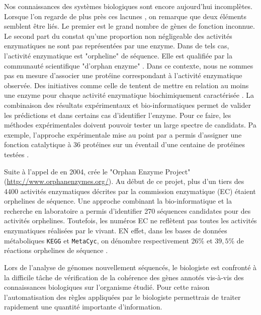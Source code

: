 \begin{refsegment}
    Nos connaissances des systèmes biologiques sont encore aujourd'hui incomplètes. Lorsque l'on regarde de plus près ces lacunes , on remarque que deux éléments semblent être liés. Le premier est le grand nombre de gènes de fonction inconnue. Le second part du constat qu'une proportion non négligeable des activités enzymatiques ne sont pas représentées par une enzyme. Dans de tels cas, l'activité enzymatique est "orpheline" de séquence. Elle est qualifiée par la communauté scientifique "d'orphan enzyme" \cite{lespinet2005orphan}. Dans ce contexte, nous ne sommes pas en mesure d'associer une protéine correspondant à l'activité enzymatique observée. Des initiatives comme celle de \citeauthor{karp2004call} tentent de mettre en relation au moins une enzyme pour chaque activité enzymatique biochimiquement caractérisée \cite{karp2004call}. La combinaison des résultats expérimentaux et bio-informatiques permet de valider les prédictions et dans certains cas d'identifier l'enzyme. Pour ce faire, les méthodes expérimentales doivent pouvoir tester un large spectre de candidats. Pa exemple, l'approche expérimentale mise au point par \citeauthor{kuznetsova2005enzyme} a permis d'assigner une fonction catalytique à 36 protéines sur un éventail d'une centaine de protéines testées \cite{kuznetsova2005enzyme}.
    
    Suite à l'appel de \citeauthor{karp2004call} en 2004, \citeauthor{shearer2014finding} crée le "Orphan Enzyme Project" (\url{http://www.orphanenzymes.org/}). Au début de ce projet, plus d'un tiers des 4400 activités enzymatiques décrites par la commission enzymatique (\gls{EC}) étaient orphelines de séquence. Une approche combinant la bio-informatique et la recherche en laboratoire a permis d'identifier 270 séquences candidates pour des activités orphelines\cite{shearer2014finding}. Toutefois, les numéros \gls{EC} ne reflètent pas toutes les activités enzymatiques réalisées par le vivant. EN effet, dans les bases de données métaboliques \texttt{KEGG} et \texttt{MetaCyc}, on dénombre  respectivement 26\% et $39,5$\% de réactions orphelines de séquence \cite{sorokina2014profiling}.
    
    Lors de l'analyse de génomes nouvellement séquencés, le biologiste est confronté à la difficile tâche de vérification de la cohérence des gènes annotés vis-à-vis des connaissances biologiques sur l'organisme étudié. Pour cette raison l'automatisation des règles appliquées par le biologiste permettrais de traiter rapidement une quantité importante d'information.
    

\end{refsegment}

